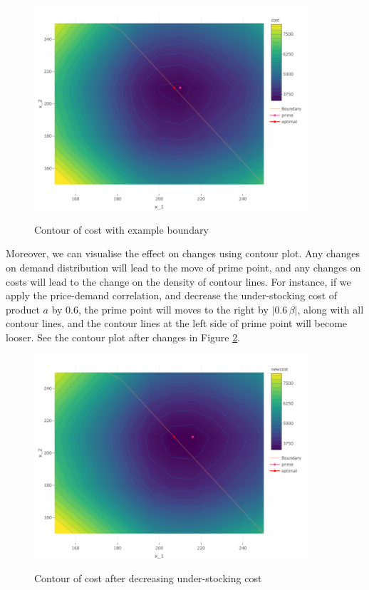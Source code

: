\documentclass[a4paper,11pt]{article}
\begin{document}
\begin{figure}[ht]
\caption{Contour of cost with example boundary}
\hspace{1cm}
\includegraphics[width=0.9\textwidth]{Example-figure_files/figure-latex/conexam.png}
\label{fig:conexam}
\end{figure}

Moreover, we can visualise the effect on changes using contour plot. Any changes on demand distribution will lead to the move of prime point, and any changes on costs will lead to the change on the density of contour lines. For instance, if we apply the price-demand correlation, and decrease the under-stocking cost of product $a$ by 0.6, the prime point will moves to the right by $|0.6\,\beta|$, along with all contour lines, and the contour lines at the left side of prime point will become looser. See the contour plot after changes in Figure \ref{fig:newcon}.

\begin{figure}[ht]
\caption{Contour of cost after decreasing under-stocking cost}
\hspace{1cm}
\includegraphics[width=0.9\textwidth]{Example-figure_files/figure-latex/newcon.png}
\label{fig:newcon}
\end{figure}
\end{document}
